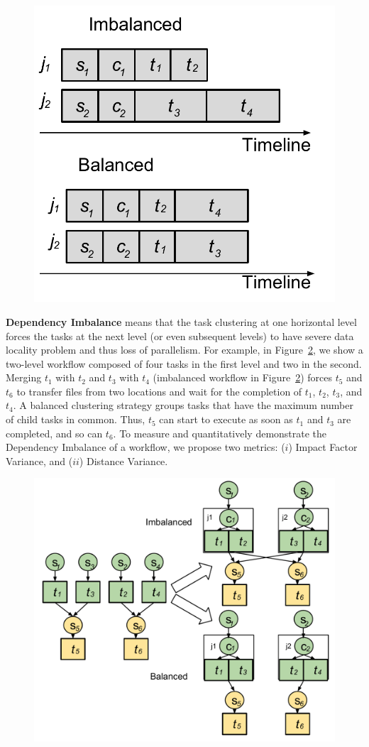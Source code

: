 \begin{figure}[htb]
	\centering
	\includegraphics[width=0.55\linewidth]{figures/imbalance/rv.pdf}
	\label{fig:imbalance_rv}
\end{figure}


\textbf{Dependency Imbalance} means that the task clustering at one horizontal level forces the tasks at the next level (or even subsequent levels) to have severe data locality problem and thus loss of parallelism. For example, in Figure~\ref{fig:imbalance_dv}, we show a two-level workflow composed of four tasks in the first level and two in the second. Merging $t_1$ with $t_2$ and $t_3$ with $t_4$ (imbalanced workflow in Figure~\ref{fig:imbalance_dv}) forces $t_5$ and $t_6$ to transfer files from two locations and wait for the completion of $t_1$, $t_2$, $t_3$, and $t_4$.  A balanced clustering strategy groups tasks that have the maximum number of child tasks in common. Thus, $t_5$ can start to execute as soon as $t_1$ and $t_3$ are completed, and so can $t_6$. To measure and quantitatively demonstrate the Dependency Imbalance of a workflow, we propose two  metrics: ($i$) Impact Factor Variance, and ($ii$) Distance Variance. 

\begin{figure}[htb]
	\centering
	\includegraphics[width=\linewidth]{figures/imbalance/dv.pdf}
	\label{fig:imbalance_dv}
\end{figure}

